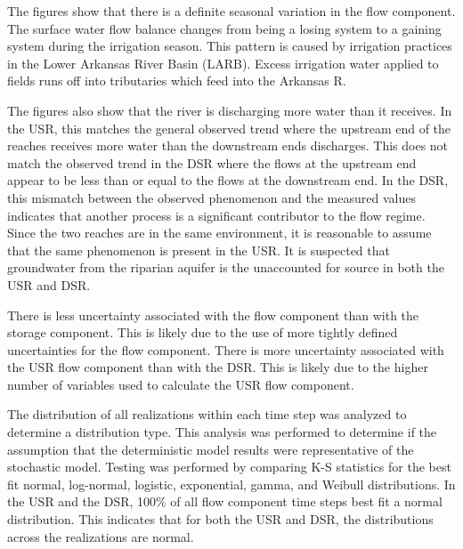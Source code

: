 \begin{linenumbers}
The figures show that there is a definite seasonal variation in the flow component.  The surface water flow balance changes from being a losing system to a gaining system during the irrigation season.  This pattern is caused by irrigation practices in the Lower Arkansas River Basin (LARB).  Excess irrigation water applied to fields runs off into tributaries which feed into the Arkansas R.

The figures also show that the river is discharging more water than it receives.  In the USR, this matches the general observed trend where the upstream end of the reaches receives more water than the downstream ends discharges.  This does not match the observed trend in the DSR where the flows at the upstream end appear to be less than or equal to the flows at the downstream end.  In the DSR, this mismatch between the observed phenomenon and the measured values indicates that another process is a significant contributor to the flow regime.  Since the two reaches are in the same environment, it is reasonable to assume that the same phenomenon is present in the USR.  It is suspected that groundwater from the riparian aquifer is the unaccounted for source in both the USR and DSR.

There is less uncertainty associated with the flow component than with the storage component.  This is likely due to the use of more tightly defined uncertainties for the flow component.  There is more uncertainty associated with the USR flow component than with the DSR.  This is likely due to the higher number of variables used to calculate the USR flow component.

The distribution of all realizations within each time step was analyzed to determine a distribution type.  This analysis was performed to determine if the assumption that the deterministic model results were representative of the stochastic model.   Testing was performed by comparing K-S statistics for the best fit normal, log-normal, logistic, exponential, gamma, and Weibull distributions.  In the USR and the DSR, 100\% of all flow component time steps best fit a normal distribution. This indicates that for both the USR and DSR, the distributions across the realizations are normal. 


\end{linenumbers}

